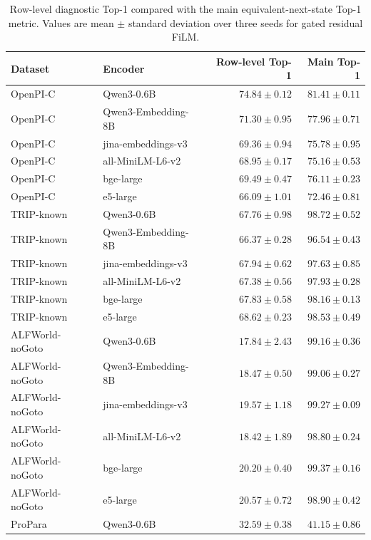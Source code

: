 \documentclass{article}
\begin{document}
\begin{table}[h]
  \centering
  \caption{Row-level diagnostic Top-1 compared with the main equivalent-next-state Top-1 metric. Values are mean $\pm$ standard deviation over three seeds for gated residual FiLM.}
  \label{tab:row-level-diagnostic}
  \tiny
  \setlength{\tabcolsep}{3pt}
  \begin{tabular}{llrr}
    \toprule
    Dataset & Encoder & Row-level Top-1 & Main Top-1 \\
    \midrule
    OpenPI-C & Qwen3-0.6B & $74.84{\pm}0.12$ & $81.41{\pm}0.11$ \\
    OpenPI-C & Qwen3-Embedding-8B & $71.30{\pm}0.95$ & $77.96{\pm}0.71$ \\
    OpenPI-C & jina-embeddings-v3 & $69.36{\pm}0.94$ & $75.78{\pm}0.95$ \\
    OpenPI-C & all-MiniLM-L6-v2 & $68.95{\pm}0.17$ & $75.16{\pm}0.53$ \\
    OpenPI-C & bge-large & $69.49{\pm}0.47$ & $76.11{\pm}0.23$ \\
    OpenPI-C & e5-large & $66.09{\pm}1.01$ & $72.46{\pm}0.81$ \\
    \midrule
    TRIP-known & Qwen3-0.6B & $67.76{\pm}0.98$ & $98.72{\pm}0.52$ \\
    TRIP-known & Qwen3-Embedding-8B & $66.37{\pm}0.28$ & $96.54{\pm}0.43$ \\
    TRIP-known & jina-embeddings-v3 & $67.94{\pm}0.62$ & $97.63{\pm}0.85$ \\
    TRIP-known & all-MiniLM-L6-v2 & $67.38{\pm}0.56$ & $97.93{\pm}0.28$ \\
    TRIP-known & bge-large & $67.83{\pm}0.58$ & $98.16{\pm}0.13$ \\
    TRIP-known & e5-large & $68.62{\pm}0.23$ & $98.53{\pm}0.49$ \\
    \midrule
    ALFWorld-noGoto & Qwen3-0.6B & $17.84{\pm}2.43$ & $99.16{\pm}0.36$ \\
    ALFWorld-noGoto & Qwen3-Embedding-8B & $18.47{\pm}0.50$ & $99.06{\pm}0.27$ \\
    ALFWorld-noGoto & jina-embeddings-v3 & $19.57{\pm}1.18$ & $99.27{\pm}0.09$ \\
    ALFWorld-noGoto & all-MiniLM-L6-v2 & $18.42{\pm}1.89$ & $98.80{\pm}0.24$ \\
    ALFWorld-noGoto & bge-large & $20.20{\pm}0.40$ & $99.37{\pm}0.16$ \\
    ALFWorld-noGoto & e5-large & $20.57{\pm}0.72$ & $98.90{\pm}0.42$ \\
    \midrule
    ProPara & Qwen3-0.6B & $32.59{\pm}0.38$ & $41.15{\pm}0.86$ \\

\end{tabular}
\end{table}
\end{document}
